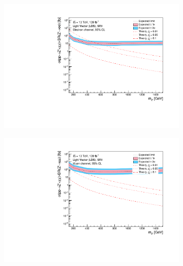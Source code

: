 \documentclass[12pt, a4paper]{book}
\begin{document}
\begin{figure}[!ht]
	\centering
	\begin{subfigure}[b]{0.49\textwidth}
      \centering
      \includegraphics[width=1\textwidth]{Limits/Model_independent/50-100/LV_LDS/mass_exclusion_ee.pdf}
   \end{subfigure}
   \hfill
   \begin{subfigure}[b]{0.49\textwidth}
      \centering
      \includegraphics[width=1\textwidth]{Limits/Model_independent/50-100/LV_LDS/mass_exclusion_uu.pdf}
   \end{subfigure}
   \hfill
   \begin{subfigure}[b]{0.49\textwidth}
      \centering

\end{subfigure}
\end{figure}
\end{document}
